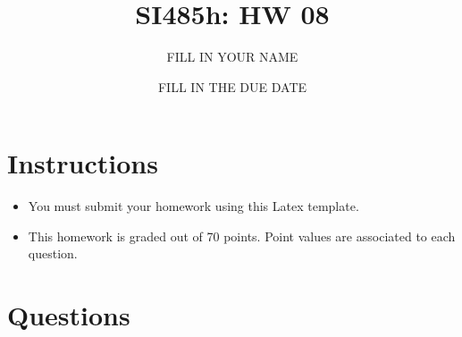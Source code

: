 \documentclass{article}[9pt]
\title{SI485h: HW 08}
\date{FILL IN THE DUE DATE}
\author{FILL IN YOUR NAME}
\begin{document}
\maketitle
\section*{Instructions}

\begin{itemize}
\item You must submit your homework using this Latex template.

\item This homework is graded out of 70 points. Point values are associated to each question.
\end{itemize}

\section*{Questions}
\label{sec:orgfb6c6bf}
\end{document}
